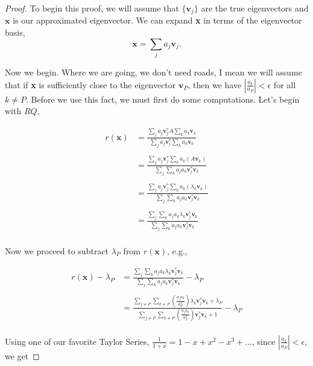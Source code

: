 \documentclass[paper=a4, fontsize=11pt]{scrartcl} %
\numberwithin{equation}{section} %
\numberwithin{figure}{section} %
\numberwithin{table}{section} %
\begin{document}
\begin{proof}

To begin this proof, we will assume that $\{ \textbf{v}_j \}$ are the true eigenvectors and $\textbf{x}$ is our approximated eigenvector. We can expand \textbf{x} in terms of the eigenvector basis, $$\textbf{x} = \sum_j a_j \textbf{v}_j.$$

Now we begin. Where we are going, we don't need roads, I mean we will assume that if \textbf{x} is sufficiently close to the eigenvector $\textbf{v}_P$, then we have $\left| \frac{a_k}{a_P}  \right| < \epsilon$ for all $k\neq P$. Before we use this fact, we must first do some computations. Let's begin with $RQ$,

\begin{align*}
r(\textbf{x} )&= \frac{  \sum_j a_j \textbf{v}_j^{*} A  \sum_k a_k \textbf{v}_k   }{  \sum_j a_j \textbf{v}_j^{*} \sum_k a_k \textbf{v}_k   } \\ \\
	&= \frac{ \sum_j a_j \textbf{v}_j^{*} \sum_k a_k (A \textbf{v}_k)   }{  \sum_j \sum_k a_j a_k \textbf{v}_j^{*} \textbf{v}_k   } \\ \\
	&=  \frac{ \sum_j a_j \textbf{v}_j^{*} \sum_k a_k ( \lambda_k \textbf{v}_k )  }{  \sum_j \sum_k a_j a_k \textbf{v}_j^{*} \textbf{v}_k   } \\ \\
	&= \frac{   \sum_j \sum_k a_j a_k \lambda_k \textbf{v}_j^{*} \textbf{v}_k     }{   \sum_j \sum_k a_j a_k \textbf{v}_j^{*} \textbf{v}_k        } \\ 
\end{align*}

Now we proceed to subtract $\lambda_P$ from $r(\textbf{x})$, e.g., 

\begin{align*}
r(\textbf{x}) - \lambda_P &= \frac{   \sum_j \sum_k a_j a_k \lambda_k \textbf{v}_j^{*} \textbf{v}_k     }{   \sum_j \sum_k a_j a_k \textbf{v}_j^{*} \textbf{v}_k        } - \lambda_P \\ \\
	&= \frac{ \sum_{j\neq P} \sum_{k\neq P} \left( \frac{a_ja_k}{a_P^2} \right) \lambda_k \textbf{v}_j^{*}\textbf{v}_k + \lambda_P     }{  \sum_{j\neq P} \sum_{k\neq P} \left( \frac{a_ja_k}{a_P^2} \right) \textbf{v}_j^{*}\textbf{v}_k + 1  } - \lambda_P \\ 
\end{align*}

Using one of our favorite Taylor Series, $\frac{1}{1+x} = 1-x+x^2-x^3+\ldots$, since $\left| \frac{a_k}{a_P}  \right| < \epsilon$, we get


\end{proof}
\end{document}
